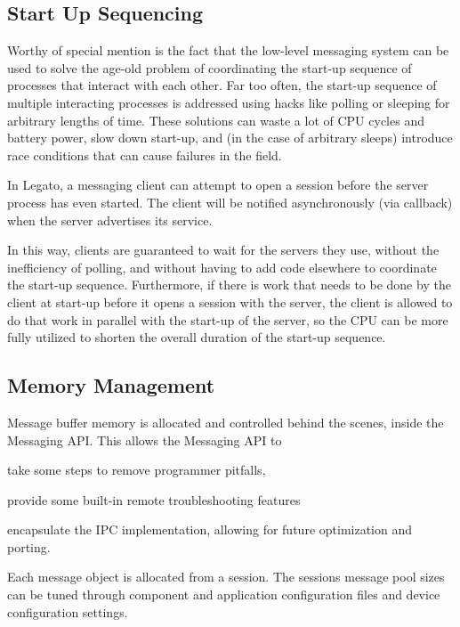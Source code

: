\hypertarget{c_messaging_c_messagingStartUp}{}\subsection{Start Up Sequencing}\label{c_messaging_c_messagingStartUp}
Worthy of special mention is the fact that the low-\/level messaging system can be used to solve the age-\/old problem of coordinating the start-\/up sequence of processes that interact with each other. Far too often, the start-\/up sequence of multiple interacting processes is addressed using hacks like polling or sleeping for arbitrary lengths of time. These solutions can waste a lot of C\+P\+U cycles and battery power, slow down start-\/up, and (in the case of arbitrary sleeps) introduce race conditions that can cause failures in the field.

In Legato, a messaging client can attempt to open a session before the server process has even started. The client will be notified asynchronously (via callback) when the server advertises its service.

In this way, clients are guaranteed to wait for the servers they use, without the inefficiency of polling, and without having to add code elsewhere to coordinate the start-\/up sequence. Furthermore, if there is work that needs to be done by the client at start-\/up before it opens a session with the server, the client is allowed to do that work in parallel with the start-\/up of the server, so the C\+P\+U can be more fully utilized to shorten the overall duration of the start-\/up sequence.\hypertarget{c_messaging_c_messagingMemoryManagement}{}\subsection{Memory Management}\label{c_messaging_c_messagingMemoryManagement}
Message buffer memory is allocated and controlled behind the scenes, inside the Messaging A\+P\+I. This allows the Messaging A\+P\+I to
\begin{DoxyItemize}
\item take some steps to remove programmer pitfalls,
\item provide some built-\/in remote troubleshooting features
\item encapsulate the I\+P\+C implementation, allowing for future optimization and porting.
\end{DoxyItemize}

Each message object is allocated from a session. The sessions\textquotesingle{} message pool sizes can be tuned through component and application configuration files and device configuration settings.

